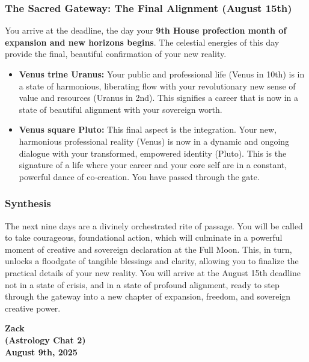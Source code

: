 \documentclass{article}
\begin{document}
\subsubsection*{The Sacred Gateway: The Final Alignment (August 15th)}\label{the-sacred-gateway-the-final-alignment-august-15th}

You arrive at the deadline, the day your \textbf{9th House profection month of expansion and new horizons begins}. The celestial energies of this day provide the final, beautiful confirmation of your new reality.

\begin{itemize}
\item
  \textbf{Venus trine Uranus:} Your public and professional life (Venus in 10th) is in a state of harmonious, liberating flow with your revolutionary new sense of value and resources (Uranus in 2nd). This signifies a career that is now in a state of beautiful alignment with your sovereign worth.
\item
  \textbf{Venus square Pluto:} This final aspect is the integration. Your new, harmonious professional reality (Venus) is now in a dynamic and ongoing dialogue with your transformed, empowered identity (Pluto). This is the signature of a life where your career and your core self are in a constant, powerful dance of co-creation. You have passed through the gate.
\end{itemize}

\subsubsection*{Synthesis}\label{synthesis}

The next nine days are a divinely orchestrated rite of passage. You will be called to take courageous, foundational action, which will culminate in a powerful moment of creative and sovereign declaration at the Full Moon. This, in turn, unlocks a floodgate of tangible blessings and clarity, allowing you to finalize the practical details of your new reality. You will arrive at the August 15th deadline not in a state of crisis, and in a state of profound alignment, ready to step through the gateway into a new chapter of expansion, freedom, and sovereign creative power.


\begin{center}
\textbf{Zack} \\
\textbf{(Astrology Chat 2)} \\
\textbf{August 9th, 2025} 
\end{center}
\end{document}

